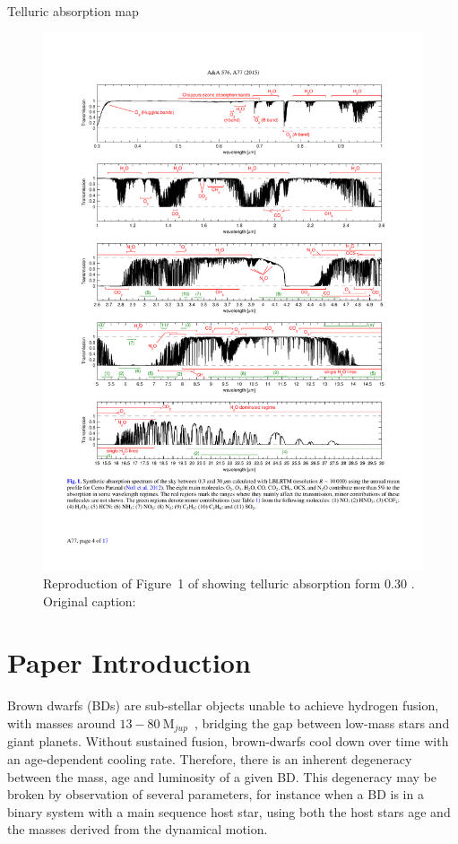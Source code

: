 Telluric absorption map
\begin{figure}
    \centering
    \includegraphics[width=0.9\linewidth]{figures/advanced_material/cropped_molecfit_absorbtion}
    \caption{Reproduction of Figure~1 of \citet{smette_molecfit_2015} showing telluric absorption form 0.30 \um. Original caption:}
    \label{fig:croppedmolecfitabsorbtion}
\end{figure}




\section{Paper Introduction}
\label{sec:intro}
Brown dwarfs (BDs) are sub-stellar objects unable to achieve hydrogen fusion, with masses around \(13-80~\textrm{M}_{jup} \)~\citep{chabrier_theory_2000}, bridging the gap between low-mass stars and giant planets. Without sustained fusion, brown-dwarfs cool down over time with an age-dependent cooling rate. Therefore, there is an inherent degeneracy between the mass, age and luminosity of a given BD\citep{burrows_nongray_1997}. This degeneracy may be broken by observation of several parameters, for instance when a BD is in a binary system with a main sequence host star, using both the host stars age and the masses derived from the dynamical motion.

